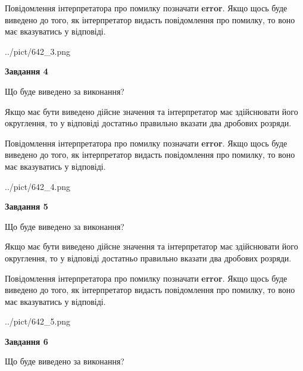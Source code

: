 \documentclass[12pt, ukrainian]{article}
\begin{document}
{\begin {Large}
Повідомлення інтерпретатора про помилку позначати \textbf{error}.
Якщо щось буде виведено до того, як інтерпретатор видасть повідомлення про помилку, 
то воно має вказуватись у відповіді. \par

\begin{center}
	{../pict/642_3.png}
\end{center}
\newpage

{\begin {center}\textbf{Завдання 4}\end {center}}\par
Що буде виведено за виконання? \par

Якщо має бути виведено дійсне значення та інтерпретатор має здійснювати його округлення, 
то у відповіді достатньо правильно вказати два дробових розряди.

Повідомлення інтерпретатора про помилку позначати \textbf{error}.
Якщо щось буде виведено до того, як інтерпретатор видасть повідомлення про помилку, 
то воно має вказуватись у відповіді. \par

\begin{center}
	{../pict/642_4.png}
\end{center}
\newpage

{\begin {center}\textbf{Завдання 5}\end {center}}\par
Що буде виведено за виконання? \par

Якщо має бути виведено дійсне значення та інтерпретатор має здійснювати його округлення, 
то у відповіді достатньо правильно вказати два дробових розряди.

Повідомлення інтерпретатора про помилку позначати \textbf{error}.
Якщо щось буде виведено до того, як інтерпретатор видасть повідомлення про помилку, 
то воно має вказуватись у відповіді. \par

\begin{center}
	{../pict/642_5.png}
\end{center}
\newpage

{\begin {center}\textbf{Завдання 6}\end {center}}\par
Що буде виведено за виконання? \par


\end{Large}}
\end{document}
